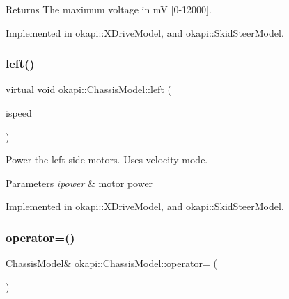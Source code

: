 \begin{DoxyReturn}{Returns}
The maximum voltage in mV {\ttfamily \mbox{[}0-\/12000\mbox{]}}. 
\end{DoxyReturn}


Implemented in \mbox{\hyperlink{classokapi_1_1XDriveModel_a402487e35a717c47cfcc85ad1cfb0861}{okapi\+::\+X\+Drive\+Model}}, and \mbox{\hyperlink{classokapi_1_1SkidSteerModel_ad4849d18c3a244eb60e1056860a3c4cf}{okapi\+::\+Skid\+Steer\+Model}}.

\mbox{\label{classokapi_1_1ChassisModel_aa2008856c169eb64c6648bc64c31c504}} 
\subsubsection{\texorpdfstring{left()}{left()}}
{\footnotesize\ttfamily virtual void okapi\+::\+Chassis\+Model\+::left (\begin{DoxyParamCaption}\item[{double}]{ispeed }\end{DoxyParamCaption})\hspace{0.3cm}{\ttfamily [pure virtual]}}

Power the left side motors. Uses velocity mode.


\begin{DoxyParams}{Parameters}
{\em ipower} & motor power \\
\hline
\end{DoxyParams}


Implemented in \mbox{\hyperlink{classokapi_1_1XDriveModel_a0a4688df022b66164e81709e6eaa02e5}{okapi\+::\+X\+Drive\+Model}}, and \mbox{\hyperlink{classokapi_1_1SkidSteerModel_af2b00108853b82eb0fb5ecb3b71f413d}{okapi\+::\+Skid\+Steer\+Model}}.

\mbox{\label{classokapi_1_1ChassisModel_ab6c89183b8a5317a1e149df5ed22dfb1}} 
\subsubsection{\texorpdfstring{operator=()}{operator=()}}
{\footnotesize\ttfamily \mbox{\hyperlink{classokapi_1_1ChassisModel}{Chassis\+Model}}\& okapi\+::\+Chassis\+Model\+::operator= (\begin{DoxyParamCaption}\item[{const \mbox{\hyperlink{classokapi_1_1ChassisModel}{Chassis\+Model}} \&}]{ }\end{DoxyParamCaption})\hspace{0.3cm}{\ttfamily [delete]}}

